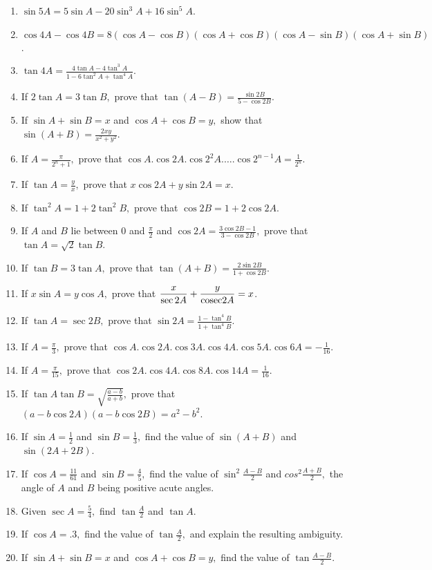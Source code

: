 \begin{enumerate}[resume]
\item $\sin 5A = 5\sin A - 20\sin^3A + 16\sin^5A$.
\item $\cos 4A - \cos 4B = 8(\cos A - \cos B)(\cos A + \cos B)(\cos A - \sin B)(\cos A + \sin B)$.
\item $\tan 4A = \frac{4\tan A - 4\tan^3A}{1 - 6\tan^2A + \tan^4A}$.
\item If $2\tan A = 3\tan B,$ prove that $\tan (A- B) = \frac{\sin 2B}{5 - \cos 2B}$.
\item If $\sin A + \sin B = x$ and $\cos A + \cos B = y,$ show that $\sin(A + B) = \frac{2xy}{x^2 + y^2}$.
\item If $A= \frac{\pi}{2^n + 1},$ prove that $\cos A.\cos 2A. \cos2^2A.\ldots.\cos2^{n - 1}A = \frac{1}{2^n}$.
\item If $\tan A = \frac{y}{x},$ prove that $x\cos 2A + y\sin 2A = x$.
\item If $\tan^2A = 1 + 2\tan^2B,$ prove that $\cos 2B = 1 + 2\cos 2A$.
\item If $A$ and $B$ lie between $0$ and $\frac{\pi}{2}$ and $\cos 2A = \frac{3\cos 2B - 1}{3 - \cos
  2B},$ prove that $\tan A = \sqrt{2}\tan B$.
\item If $\tan B = 3\tan A,$ prove that $\tan(A + B) = \frac{2\sin 2B}{1 + \cos 2B}$.
\item If $x\sin A = y\cos A,$ prove that $\frac{x}{\sec 2A} + \frac{y}{{\rm cosec} 2A} = x$.
\item If $\tan A = \sec 2B,$ prove that $\sin 2A = \frac{1 - \tan^4B}{1 + \tan^4B}$.
\item If $A = \frac{\pi}{3},$ prove that $\cos A.\cos 2A. \cos 3A.\cos 4A.\cos 5A.\cos 6A = -\frac{1}{16}$.
\item If $A = \frac{\pi}{15},$ prove that $\cos2A.\cos4A.\cos8A.\cos14A = \frac{1}{16}$.
\item If $\tan A\tan B = \sqrt{\frac{a - b}{a + b}},$ prove that $(a - b\cos2A)(a - b\cos2B) = a^2 - b^2$.
\item If $\sin A = \frac{1}{2}$ and $\sin B = \frac{1}{3},$ find the value of $\sin(A + B)$ and $\sin(2A +
  2B)$.
\item If $\cos A = \frac{11}{61}$ and $\sin B = \frac{4}{5},$ find the value of $\sin^2 \frac{A - B}{2}$ and
  $cos^2\frac{A + B}{2},$ the angle of $A$ and $B$ being positive acute angles.
\item Given $\sec A = \frac{5}{4},$ find $\tan\frac{A}{2}$ and $\tan A$.
\item If $\cos A = .3,$ find the value of $\tan \frac{A}{2},$ and explain the resulting ambiguity.
\item If $\sin A + \sin B = x$ and $\cos A + \cos B = y,$ find the value of $\tan \frac{A - B}{2}$.
\end{enumerate}


